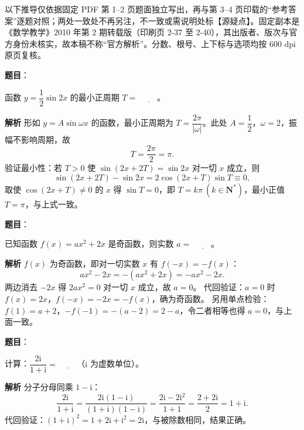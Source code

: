 

\begin{gktip}
以下推导仅依据固定 PDF 第 1–2 页题面独立写出，再与第 3–4 页印载的“参考答案”逐题对照；两处一致处不再另注，不一致或需说明处标【源疑点】。固定副本是《数学教学》2010 年第 2 期转载版（印刷页 2-37 至 2-40），其出版者、版次与官方身份未核实，故本稿不称“官方解析”。分数、根号、上下标与选项均按 600 dpi 原页复核。
\end{gktip}

\begin{answer}

\textbf{题目}：

函数 $y=\dfrac12\sin 2x$ 的最小正周期 $T=$ $\underline{\qquad}$。

\textbf{解析}
形如 $y=A\sin\omega x$ 的函数，最小正周期为 $T=\dfrac{2\pi}{|\omega|}$。此处 $A=\dfrac12$，$\omega=2$，振幅不影响周期，故
\nopagebreak[4]
\[T=\frac{2\pi}{2}=\pi.\]
验证最小性：若 $T>0$ 使 $\sin(2x+2T)=\sin2x$ 对一切 $x$ 成立，则
\nopagebreak[4]
\[\sin(2x+2T)-\sin2x=2\cos(2x+T)\sin T\equiv0,\]
取使 $\cos(2x+T)\neq0$ 的 $x$ 得 $\sin T=0$，即 $T=k\pi\ (k\in\mathbf N^*)$，最小正值 $T=\pi$，与上式一致。


\end{answer}
\begin{answer}

\textbf{题目}：

已知函数 $f(x)=ax^2+2x$ 是奇函数，则实数 $a=$ $\underline{\qquad}$。

\textbf{解析}
$f(x)$ 为奇函数，即对一切实数 $x$ 有 $f(-x)=-f(x)$：
\nopagebreak[4]
\[ax^2-2x=-\left(ax^2+2x\right)=-ax^2-2x.\]
两边消去 $-2x$ 得 $2ax^2=0$ 对一切 $x$ 成立，故 $a=0$。
代回验证：$a=0$ 时 $f(x)=2x$，$f(-x)=-2x=-f(x)$，确为奇函数。
另用单点检验：$f(1)=a+2$，$-f(-1)=-(a-2)=2-a$，令二者相等也得 $a=0$，与上面一致。


\end{answer}
\begin{answer}

\textbf{题目}：

计算：$\dfrac{2\mathrm i}{1+\mathrm i}=$ $\underline{\qquad}$（$\mathrm i$ 为虚数单位）。

\textbf{解析}
分子分母同乘 $1-\mathrm i$：
\nopagebreak[4]
\[\frac{2\mathrm i}{1+\mathrm i}=\frac{2\mathrm i\left(1-\mathrm i\right)}{\left(1+\mathrm i\right)\left(1-\mathrm i\right)}=\frac{2\mathrm i-2\mathrm i^2}{1+1}=\frac{2+2\mathrm i}{2}=1+\mathrm i.\]
代回验证：$(1+\mathrm i)^2=1+2\mathrm i+\mathrm i^2=2\mathrm i$，与被除数相同，结果正确。


\end{answer}
